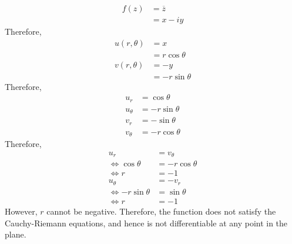 \documentclass[fleqn, a4paper, 11pt, oneside]{amsart}
\theoremstyle{definition}
\theoremstyle{theorem}
\begin{document}
\begin{solution}
	\begin{align*}
		f(z) & = \overline{z} \\
                     & = x - i y
	\end{align*}
	Therefore,
	\begin{align*}
		u(r,\theta) & = x             \\
                            & = r \cos \theta \\
		v(r,\theta) & = -y            \\
                            & = -r \sin \theta
	\end{align*}
	Therefore,
	\begin{align*}
		u_r        & = \cos \theta    \\
		u_{\theta} & = -r \sin \theta \\
		v_r        & = -\sin \theta   \\
		v_{\theta} & = -r \cos \theta
	\end{align*}
	Therefore,
	\begin{align*}
		u_r                 & = v_{\theta}     \\
		\iff \cos \theta    & = -r \cos \theta \\
		\iff r              & = -1             \\
		u_{\theta}          & = -v_r           \\
		\iff -r \sin \theta & = \sin \theta    \\
		\iff r              & = -1
	\end{align*}
	However, $r$ cannot be negative.
	Therefore, the function does not satisfy the Cauchy-Riemann equations, and hence is not differentiable at any point in the plane.
\end{solution}
\end{document}
